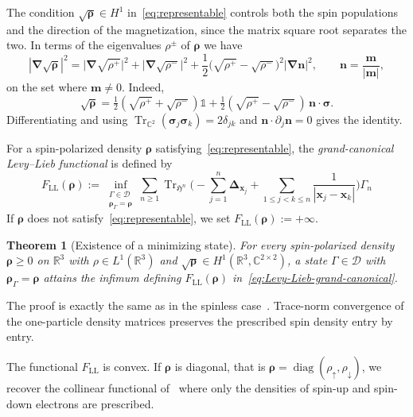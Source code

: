 \documentclass[final,reqno]{amsart}
\newtheorem{theorem}{Theorem}[section]
\theoremstyle{remark}
\renewcommand{\le}{\leqslant}
\renewcommand{\ge}{\geqslant}
\newcommand{\spu}{\uparrow}
\newcommand{\spd}{\downarrow}
\DeclareMathOperator{\diag}{diag}
\DeclareMathOperator{\Tr}{Tr}
\newcommand{\Trs}{\Tr_{\CC^2}}
\newcommand{\RR}{\mathbb{R}}
\newcommand{\CC}{\mathbb{C}}
\newcommand{\LL}{\mathrm{LL}}
\newcommand{\iden}{\mathbb{1}}
\newcommand{\lapl}{\bm{\Delta}}
\newcommand{\grad}{\bm{\nabla}}
\newcommand{\HF}{\mathfrak{H}}
\begin{document}
The condition $\sqrt{\bm{\rho}}\in H^1$ in~\cref{eq:representable} controls both the spin populations and the direction of the magnetization, since the matrix square root separates the two. In terms of the eigenvalues $\rho^\pm$ of $\bm{\rho}$ we have
\begin{equation}\label{eq:formula_gradient_sqrt_R}
|\grad\sqrt{\bm{\rho}}|^2=\big|\grad\sqrt{\rho^+}\big|^2+\big|\grad\sqrt{\rho^-}\big|^2+\frac12\Big(\sqrt{\rho^+}-\sqrt{\rho^-}\Big)^2|\grad \mathbf{n}|^2,\qquad \mathbf{n}=\frac{\mathbf{m}}{|\mathbf{m}|},
\end{equation}
on the set where $\mathbf{m}\ne0$. Indeed,
\[
\sqrt{\bm{\rho}}=\tfrac12(\sqrt{\rho^+}+\sqrt{\rho^-})\iden+
\tfrac12(\sqrt{\rho^+}-\sqrt{\rho^-})\,\mathbf{n}\cdot\bm{\sigma}.
\]
Differentiating and using $\Trs(\bm{\sigma}_j\bm{\sigma}_k)=2\delta_{jk}$ and $\mathbf{n}\cdot\partial_j\mathbf{n}=0$ gives the identity.

For a spin-polarized density $\bm{\rho}$ satisfying~\cref{eq:representable}, the \emph{grand-canonical Levy--Lieb functional} is defined by
\begin{equation}\label{eq:Levy-Lieb-grand-canonical}
\boxed{F_\LL(\bm{\rho}):=\inf_{\substack{\Gamma\in\mathcal{D}\\ \bm{\rho}_\Gamma=\bm{\rho}}}\sum_{n\ge1}\Tr_{\HF^n}\Bigg(-\sum_{j=1}^n\lapl_{\mathbf{x}_j}+\sum_{1\le j<k\le n}\frac{1}{|\mathbf{x}_j-\mathbf{x}_k|}\Bigg)\Gamma_n}
\end{equation}
If $\bm{\rho}$ does not satisfy~\cref{eq:representable}, we set $F_\LL(\bm{\rho}):=+\infty$.

\begin{theorem}[Existence of a minimizing state]\label{thm:LL_attainment}
For every spin-polarized density $\bm{\rho}\ge0$ on $\RR^3$ with $\rho\in L^1(\RR^3)$ and $\sqrt{\bm{\rho}}\in H^1(\RR^3,\CC^{2\times2})$, a state $\Gamma\in\mathcal{D}$ with $\bm{\rho}_\Gamma=\bm{\rho}$ attains the infimum defining $F_\LL(\bm{\rho})$ in~\cref{eq:Levy-Lieb-grand-canonical}.
\end{theorem}

The proof is exactly the same as in the spinless case~\cite[Theorem~3.4]{lewin2023universal}. Trace-norm convergence of the one-particle density matrices preserves the prescribed spin density entry by entry.

The functional $F_\LL$ is convex. If $\bm{\rho}$ is diagonal, that is $\bm{\rho}=\diag(\rho_\spu,\rho_\spd)$, we recover the collinear functional of~\cite[Remark~6]{lewin2020local} where only the densities of spin-up and spin-down electrons are prescribed.
\end{document}
